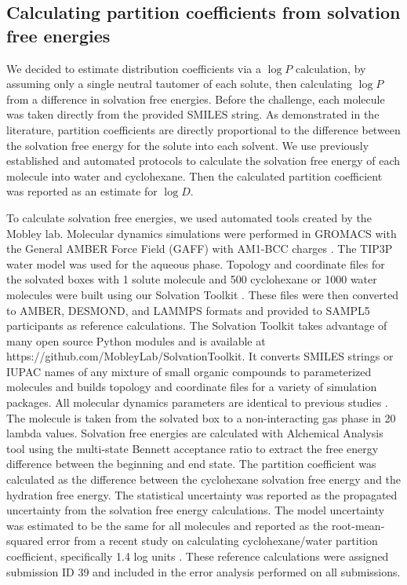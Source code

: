 \subsection{Calculating partition coefficients from solvation free energies}
\label{methods:2}
We decided to estimate distribution coefficients via a $\log P$ calculation, by assuming only a single neutral tautomer of each solute, then calculating $\log P$ from a difference in solvation free energies. 
Before the challenge, each molecule was taken directly from the provided SMILES string.
As demonstrated in the literature,  \cite{Essex:1992bd,Best:1999ix,JohnEEksterowicz:1997cj,Jorgensen:1989ga,Jorgensen:1990ha,Garrido:2009hz,Garrido:2011es,Garrido:2012gc,Yang:2013io,Michel:2007gw,Genheden:2016jj}
partition coefficients are directly proportional to the difference between the solvation free energy for the solute into each solvent. 
We use previously established and automated protocols  \cite{Bannan:2016lp} 
to calculate the solvation free energy of each molecule into water and cyclohexane. 
Then the calculated partition coefficient was reported as an estimate for $\log D$. 

To calculate solvation free energies, we used automated tools created by the Mobley lab.
Molecular dynamics simulations were performed in GROMACS   \cite{Berendsen:1995gro,Hess:2008db,Lindahl:2001gro3,vanderSpoel:2005hz,Pronk:2013ef,Pall:2014gb,Abraham:2015gj}
with the General AMBER Force Field (GAFF)  \cite{Wang:2004dev} with AM1-BCC charges  \cite{Jakalian:2000ki,Jakalian:2002bd}.
The TIP3P water model  \cite{Jorgensen:1983fl} was used for the aqueous phase. 
Topology and coordinate files for the solvated boxes with 1 solute molecule and 500 cyclohexane or 1000 water molecules were built using our Solvation Toolkit  \cite{Bannan:2016lp}.
These files were then converted to AMBER, DESMOND, and LAMMPS formats and provided to SAMPL5 participants as reference calculations.
The Solvation Toolkit takes advantage of many open source Python modules and is available at https://github.com/MobleyLab/SolvationToolkit.
It converts SMILES strings or IUPAC names of any mixture of small organic compounds to parameterized molecules and builds topology and coordinate files for a variety of simulation packages. 
All molecular dynamics parameters are identical to previous studies  \cite{Liu:2016kb,Klimovich:2010jm,Bannan:2016lp}.
The molecule is taken from the solvated box to a non-interacting gas phase in 20 lambda values. 
Solvation free energies are calculated with Alchemical Analysis tool  \cite{Klimovich:2015er} using the multi-state Bennett acceptance ratio to extract the free energy difference between the beginning and end state. 
The partition coefficient was calculated as the difference between the cyclohexane solvation free energy and the hydration free energy.
The statistical uncertainty was reported as the propagated uncertainty from the solvation free energy calculations. 
The model uncertainty was estimated to be the same for all molecules and reported as the root-mean-squared error from a recent study on calculating cyclohexane/water partition coefficient, specifically 1.4 log units  \cite{Bannan:2016lp}.
These reference calculations were assigned submission ID 39 and included in the error analysis performed on all submissions.

